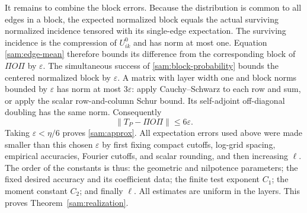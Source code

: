 It remains to combine the block errors.  Because the distribution
is common to all edges in a block, the expected normalized block
equals the actual surviving normalized incidence tensored with its
single-edge expectation.  The surviving incidence is the compression
of \(U^0_{ik}\) and has norm at most one.  Equation
\eqref{sam:edge-mean} therefore bounds its difference from the
corresponding block of \(\Pi O\Pi\) by \(\varepsilon\).
The simultaneous success of \eqref{sam:block-probability} bounds
the centered normalized block by \(\varepsilon\).  A matrix with
layer width one and block norms bounded by \(\varepsilon\) has
norm at most \(3\varepsilon\): apply Cauchy--Schwarz to each row
and sum, or apply the scalar row-and-column Schur bound.  Its
self-adjoint off-diagonal doubling has the same norm.  Consequently
\[
 \|T_P-\Pi O\Pi\|\le6\varepsilon.
\]
Taking \(\varepsilon<\eta/6\) proves
\eqref{sam:approx}.  All expectation errors used above were made
smaller than this chosen \(\varepsilon\) by first fixing compact
cutoffs, log-grid spacing, empirical accuracies, Fourier cutoffs,
and scalar rounding, and then increasing \(\ell\).  The order of
the constants is thus: the geometric and nilpotence parameters;
the fixed desired accuracy and its coefficient data; the finite
test exponent \(C_1\); the moment constant \(C_2\); and finally
\(\ell\).  All estimates are uniform in the layers.  This proves
Theorem~\ref{sam:realization}.
